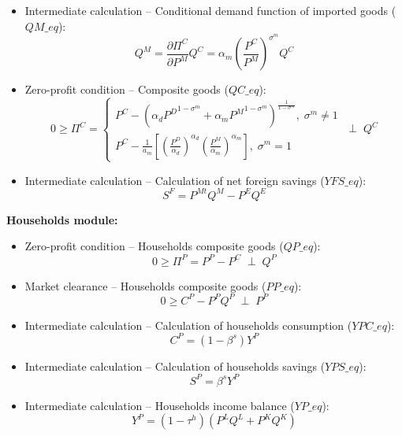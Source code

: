 \documentclass[12pt, a4paper]{article}
\numberwithin{equation}{section}
\numberwithin{figure}{section}
\numberwithin{table}{section}
\begin{document}
\begin{itemize}
\begin{equation}
		Q^D = \frac{\partial\Pi^C}{\partial P^D}Q^C = \alpha_{d}\left(\frac{P^C}{P^D}\right)^{\sigma^{m}}Q^C
	\end{equation}
	\item Intermediate calculation -- Conditional demand function of imported goods (\(QM\_eq\)): 
	\begin{equation}
		Q^M = \frac{\partial\Pi^C}{\partial P^M}Q^C = \alpha_{m}\left(\frac{P^C}{P^M}\right)^{\sigma^{m}}Q^C
	\end{equation}
	\item Zero-profit condition -- Composite goods (\(QC\_eq\)): 
	\begin{equation}
		0\geq\Pi^C = 
		\begin{cases}
		 P^C-\left(\alpha_{d}{P^D}^{1-\sigma^m}+\alpha_{m}{P^M}^{1-\sigma^m}\right)^{\frac{1}{1-\sigma^m}},\; \sigma^m\ne1\\
		 P^C-\frac{1}{a_m}\left[\left(\frac{P^D}{\alpha_{d}}\right)^{\alpha_{d}}\left(\frac{P^M}{\alpha_{m}}\right)^{\alpha_{m}}\right],\; \sigma^m=1
		\end{cases}
		\;\perp\; Q^C
	\end{equation}
	\item Intermediate calculation -- Calculation of net foreign savings (\(YFS\_eq\)): 
	\begin{equation}
		S^F = P^{Mt}Q^{M} - P^{E}Q^{E}
	\end{equation}
\end{itemize}

\textbf{Households module:}
\begin{itemize}
	\item Zero-profit condition -- Households composite goods (\(QP\_eq\)): 
	\begin{equation}
		0\geq\Pi^P = P^P - P^C \;\perp\; Q^P
	\end{equation}
	\item Market clearance -- Households composite goods (\(PP\_eq\)): 
	\begin{equation}
		0\geq C^P - P^{P}Q^{P} \;\perp\; P^P
	\end{equation}
	\item Intermediate calculation -- Calculation of households consumption (\(YPC\_eq\)): 
	\begin{equation}
		C^P = \left(1-\beta^s\right)Y^P
	\end{equation}
	\item Intermediate calculation -- Calculation of households savings (\(YPS\_eq\)): 
	\begin{equation}
		S^P = \beta^{s}Y^P
	\end{equation}
	\item Intermediate calculation -- Households income balance (\(YP\_eq\)): 
	\begin{equation}
		Y^P = \left(1-\tau^h\right)\left(P^{L}Q^{L} + P^{K}Q^{K}\right)
	\end{equation}
\end{itemize}
\end{document}

